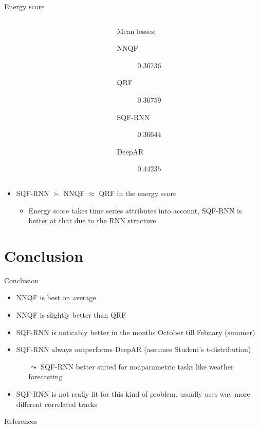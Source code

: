 \documentclass[10pt,aspectratio=169]{beamer}
\begin{document}
\begin{frame}[fragile]{Energy score}
    \begin{columns}
    \begin{column}{0.5\textwidth}
    \begin{flushright}
        
    \end{flushright}
    \end{column}
    \begin{column}{0.5\textwidth}
    Mean losses:
    \begin{description}
        \item[\textcolor{TolDarkBlue}{NNQF}] \(0.36736\)
        \item[\textcolor{TolLightBrown}{QRF}] \(0.36759\)
        \item[\textcolor{TolLightGreen}{SQF-RNN}] \(0.36644\)
        \item[\textcolor{TolDarkBrown}{DeepAR}] \(0.44235\)
    \end{description}
    \end{column}
    \end{columns}
    
    \begin{itemize}
        \item SQF-RNN \(\succ\) NNQF \(\approx\) QRF in the energy score
        \begin{itemize}
            \item Energy score takes time series attributes into account, SQF-RNN is better at that due to the RNN structure
        \end{itemize}
    \end{itemize}
\end{frame}

\section{Conclusion}

\begin{frame}{Conclusion}
    \begin{itemize}
        \item NNQF is best on average
        \item NNQF is slightly better than QRF
        \item SQF-RNN is noticably better in the months October till Febuary (summer)
        \item SQF-RNN always outperforms DeepAR (assumes Student's \(t\)-distribution)
        \begin{itemize}
            \item[\(\leadsto\)] SQF-RNN better suited for nonparametric tasks like weather forecasting
        \end{itemize}
        \item SQF-RNN is not really fit for this kind of problem, usually uses way more different correlated tracks
    \end{itemize}
\end{frame}

\begin{frame}{References}
    \printbibliography[heading=none]
\end{frame}
\end{document}
